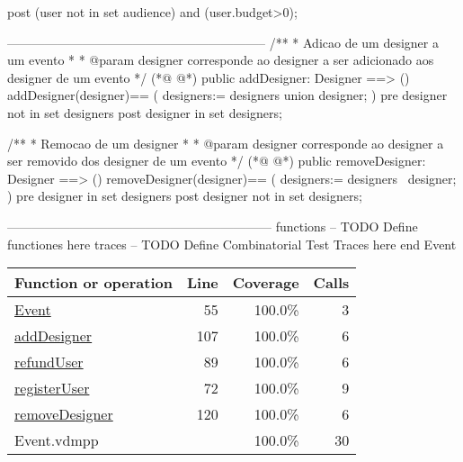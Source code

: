 \begin{vdmpp}[breaklines=true]
 post (user not in set audience) and
    (user.budget>0);

--------------------------------------------------------------
 /**
 * Adicao de um designer a um evento
 * 
 * @param designer corresponde ao designer a ser adicionado aos designer de um evento
 */
(*@
\label{addDesigner:107}
@*)
 public addDesigner: Designer ==> ()
 addDesigner(designer)==
 (
  designers:= designers union {designer};
 )
 pre designer not in set designers
 post designer in set designers;
 
 /**
 * Remocao de um designer
 * 
 * @param designer corresponde ao designer a ser removido dos designer de um evento
 */
(*@
\label{removeDesigner:120}
@*)
 public removeDesigner: Designer ==> ()
 removeDesigner(designer)==
 (
  designers:= designers \ {designer};
 )
 pre designer in set designers
 post designer not in set designers;
 
---------------------------------------------------------------
functions
-- TODO Define functiones here
traces
-- TODO Define Combinatorial Test Traces here
end Event
\end{vdmpp}
\bigskip
\begin{longtable}{|l|r|r|r|}
\hline
Function or operation & Line & Coverage & Calls \\
\hline
\hline
\hyperref[Event:55]{Event} & 55&100.0\% & 3 \\
\hline
\hyperref[addDesigner:107]{addDesigner} & 107&100.0\% & 6 \\
\hline
\hyperref[refundUser:89]{refundUser} & 89&100.0\% & 6 \\
\hline
\hyperref[registerUser:72]{registerUser} & 72&100.0\% & 9 \\
\hline
\hyperref[removeDesigner:120]{removeDesigner} & 120&100.0\% & 6 \\
\hline
\hline
Event.vdmpp & & 100.0\% & 30 \\
\hline
\end{longtable}

